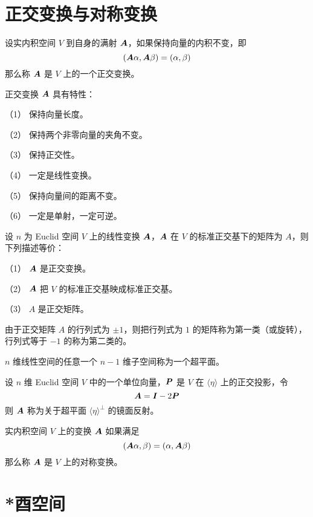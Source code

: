 \section{正交变换与对称变换}

\begin{definition}
    设实内积空间 $V$ 到自身的满射 $\boldsymbol{A}$，如果保持向量的内积不变，即
    \[ (\boldsymbol{A}\alpha,\boldsymbol{A}\beta) = (\alpha,\beta) \]
    那么称 $\boldsymbol{A}$ 是 $V$ 上的一个正交变换。
\end{definition}

\begin{proposition}
    正交变换 $\boldsymbol{A}$ 具有特性：

    （1） 保持向量长度。

    （2） 保持两个非零向量的夹角不变。

    （3） 保持正交性。

    （4） 一定是线性变换。

    （5） 保持向量间的距离不变。

    （6） 一定是单射，一定可逆。
\end{proposition}

\begin{theorem}
    设 $n$ 为 Euclid 空间 $V$ 上的线性变换 $\boldsymbol{A}$，$\boldsymbol{A}$ 在 $V$ 的标准正交基下的矩阵为 $A$，则下列描述等价：

    （1） $\boldsymbol{A}$ 是正交变换。

    （2） $\boldsymbol{A}$ 把 $V$ 的标准正交基映成标准正交基。

    （3） $A$ 是正交矩阵。
\end{theorem}

由于正交矩阵 $A$ 的行列式为 $\pm 1$，则把行列式为 $1$ 的矩阵称为第一类（或旋转），行列式等于 $-1$ 的称为第二类的。

$n$ 维线性空间的任意一个 $n-1$ 维子空间称为一个超平面。

\begin{definition}
    设 $n$ 维 Euclid 空间 $V$ 中的一个单位向量，$\boldsymbol{P}$ 是 $V$ 在 $\langle \eta \rangle$ 上的正交投影，令
    \[ \boldsymbol{A} = \boldsymbol{I} - 2 \boldsymbol{P} \]
    则 $\boldsymbol{A}$ 称为关于超平面 $\langle \eta \rangle^\bot$ 的镜面反射。
\end{definition}

\begin{definition}
    实内积空间 $V$ 上的变换 $\boldsymbol{A}$ 如果满足
    \[ (\boldsymbol{A}\alpha,\beta) = (\alpha,\boldsymbol{A}\beta) \]
    那么称 $\boldsymbol{A}$ 是 $V$ 上的对称变换。
\end{definition}

\section{*酉空间}


